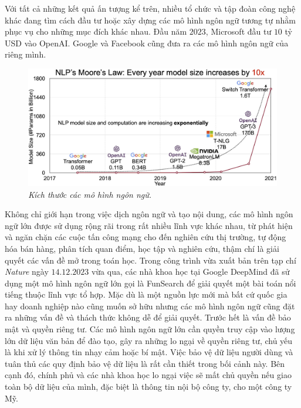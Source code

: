 \begin{multicols}{2}
	Với tất cả những kết quả ấn tượng kể trên, nhiều tổ chức và tập đoàn công nghệ khác đang tìm cách đầu tư hoặc xây dựng các mô hình ngôn ngữ tương tự nhằm phục vụ cho những mục đích khác nhau. Đầu năm $2023$, Microsoft đầu tư $10$ tỷ USD vào OpenAI. Google và Facebook cũng đưa ra các mô hình ngôn ngữ của riêng mình. 
	\vskip 0.1cm
	\begin{figure}[H]
		\vspace*{-5pt}
		\centering
		\captionsetup{labelformat= empty, justification=centering}
		\includegraphics[width= 1\linewidth]{MooreAI.png}
		\caption{\small\textit{\color{timhieukhoahoc}Kích thước các mô hình ngôn ngữ.}}
		\vspace*{-10pt}
	\end{figure}
	Không chỉ giới hạn trong việc dịch ngôn ngữ và tạo nội dung, các mô hình ngôn ngữ lớn được sử dụng rộng rãi trong rất nhiều lĩnh vực khác nhau, từ phát hiện và ngăn chặn các cuộc tấn công mạng cho đến nghiên cứu thị trường, tự động hóa bán hàng, phân tích quan điểm, học tập và nghiên cứu, thậm chí là giải quyết các vấn đề mở trong toán học. Trong công trình vừa xuất bản trên tạp chí \textit{Nature} ngày $14.12.2023$ vừa qua, các nhà khoa học tại Google DeepMind đã sử dụng một mô hình ngôn ngữ lớn gọi là FunSearch để giải quyết một bài toán nổi tiếng thuộc lĩnh vực tổ hợp. 
	\vskip 0.1cm
	Mặc dù là một nguồn lực mới mà bất cứ quốc gia hay doanh nghiệp nào cũng muốn sở hữu nhưng các mô hình ngôn ngữ cũng đặt ra những vấn đề và thách thức không dễ để giải quyết. 
	\vskip 0.1cm
	Trước hết là vấn đề bảo mật và quyền riêng tư. Các mô hình ngôn ngữ lớn cần quyền truy cập vào lượng lớn dữ liệu văn bản để đào tạo, gây ra những lo ngại về quyền riêng tư, chủ yếu là khi xử lý thông tin nhạy cảm hoặc bí mật. Việc bảo vệ dữ liệu người dùng và tuân thủ các quy định bảo vệ dữ liệu là rất cần thiết trong bối cảnh này. Bên cạnh đó, chính phủ và các nhà khoa học lo ngại việc sẽ mất chủ quyền nếu giao toàn bộ dữ liệu của mình, đặc biệt là thông tin nội bộ công ty, cho một công ty Mỹ. 

\end{multicols}
